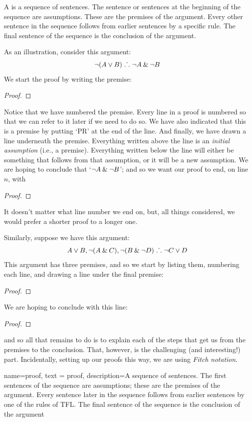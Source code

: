 A  is a sequence of sentences. The sentence or sentences at the beginning of the sequence are assumptions. These are the premises of the argument. Every other sentence in the sequence follows from earlier sentences by a specific rule. The final sentence of the sequence is the conclusion of the argument.

As an illustration, consider this argument:
	$${\neg} (A \vee B) \mathrel{\ldotp\dot{}\,\ldotp} {\neg} A \mathbin{\&} {\neg} B$$
We start the proof by writing the premise:
\begin{proof}
	 
\end{proof}
Notice that we have numbered the premise. Every line in a proof is numbered so that we can refer to it later if we need to do so. We have also indicated that this is a premise by putting `PR' at the end of the line. And finally, we have drawn a line underneath the premise. Everything written above the line is an \emph{initial assumption} (i.e., a premise). Everything written below the line will either be something that follows from that assumption, or it will be a new assumption. We are hoping to conclude that `${\neg} A \mathbin{\&} {\neg} B$'; and so we want our proof to end, on line $n$, with
\begin{proof}
\end{proof}
It doesn't matter what line number we end on, but, all things considered, we would prefer a shorter proof to a longer one.

Similarly, suppose we have this argument:
$$A\vee B, {\neg} (A\mathbin{\&} C), {\neg} (B \mathbin{\&} {\neg} D) \mathrel{\ldotp\dot{}\,\ldotp} {\neg} C\vee D$$
This argument has three premises, and so we start by listing them, numbering each line, and drawing a line under the final premise:
\begin{proof}
	 
	 
	 
\end{proof}
We are hoping to conclude with this line:
\begin{proof}
\end{proof}
and so all that remains to do is to explain each of the steps that get us from the premises to the conclusion. That, however, is the challenging (and interesting!) part. Incidentally, setting up our proofs this way, we are using \textit{Fitch notation}.

{
  name=proof,
  text = proof,
description={A sequence of sentences. The first sentences of the sequence are assumptions; these are the premises of the argument. Every sentence later in the sequence follows from earlier sentences by one of the rules of TFL. The final sentence of the sequence is the conclusion of the argument}
}

